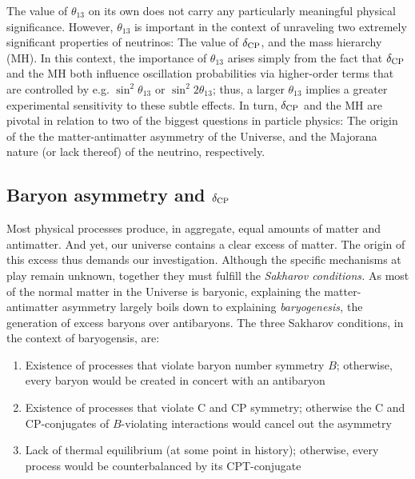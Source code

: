 \documentclass[../thesis.tex]{subfiles}
\begin{document}
The value of $\theta_{13}$ on its own does not carry any particularly meaningful
physical significance. However, $\theta_{13}$ is important in the context of
unraveling two extremely significant properties of neutrinos: The value of
$\delta_\text{CP}$, and the mass hierarchy (MH). In this context, the importance of
$\theta_{13}$ arises simply from the fact that $\delta_\text{CP}$ and the MH both influence
oscillation probabilities via higher-order terms that are controlled by
e.g. \(\sin^2\theta_{13}\) or \(\sin^2 2\theta_{13}\); thus, a larger
$\theta_{13}$ implies a greater experimental sensitivity to these subtle
effects. In turn, $\delta_\text{CP}$ and the MH are pivotal in relation to two of the
biggest questions in particle physics: The origin of the the matter-antimatter
asymmetry of the Universe, and the Majorana nature (or lack thereof) of the
neutrino, respectively.

\subsection{Baryon asymmetry and $\delta_\text{CP}$}
\label{sec:baryonAsym}

Most physical processes produce, in aggregate, equal amounts of matter and
antimatter. And yet, our universe contains a clear excess of matter. The origin
of this excess thus demands our investigation. Although the specific mechanisms
at play remain unknown, together they must fulfill the \emph{Sakharov
  conditions.} As most of the normal matter in the Universe is baryonic,
explaining the matter-antimatter asymmetry largely boils down to explaining
\emph{baryogenesis,} the generation of excess baryons over antibaryons. The
three Sakharov conditions, in the context of baryogensis, are:

\begin{enumerate}
\item Existence of processes that violate baryon number symmetry $B$; otherwise,
  every baryon would be created in concert with an antibaryon
\item Existence of processes that violate C and CP symmetry; otherwise the C and
  CP-conjugates of $B$-violating interactions would cancel out the asymmetry
\item Lack of thermal equilibrium (at some point in history); otherwise, every
  process would be counterbalanced by its CPT-conjugate
\end{enumerate}
\end{document}
